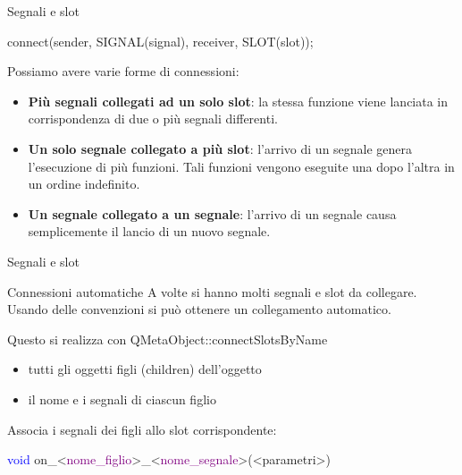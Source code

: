 \documentclass[10pt, aspectratio=169]{beamer}
\begin{document}
\begin{frame}{Segnali e slot}
	\begin{block}{}
		\begin{center}
			{\ttfamily connect(sender, SIGNAL(signal), receiver, SLOT(slot));}
		\end{center}
	\end{block}
	\bigskip
	Possiamo avere varie forme di connessioni:
	\begin{itemize}
		\item \textbf{Più segnali collegati ad un solo slot}: la stessa funzione viene lanciata in corrispondenza di due o più segnali differenti.
		\item \textbf{Un solo segnale collegato a più slot}: l'arrivo di un segnale genera l'esecuzione di più funzioni. Tali funzioni vengono eseguite una dopo l'altra in un ordine indefinito.
		\item \textbf{Un segnale collegato a un segnale}: l'arrivo di un segnale causa semplicemente il lancio di un nuovo segnale.
	\end{itemize}
\end{frame}

\begin{frame}{Segnali e slot}
	\begin{block}{Connessioni automatiche}
		A volte si hanno molti segnali e slot da collegare. Usando delle convenzioni si può ottenere un collegamento automatico. 
		
		Questo si realizza con {\ttfamily QMetaObject::connectSlotsByName}
		\begin{itemize}
			\item tutti gli oggetti figli (children) dell'oggetto
			\item il nome e i segnali di ciascun figlio
		\end{itemize}
		
		\bigskip
		Associa i segnali dei figli allo slot corrispondente:
		
		\bigskip
		\centering
		{\ttfamily \textcolor{blue}{void} on\_<\textcolor{purple}{nome\_figlio}>\_<\textcolor{purple}{nome\_segnale}>(<parametri>)}
	\end{block}
\end{frame}
\end{document}

